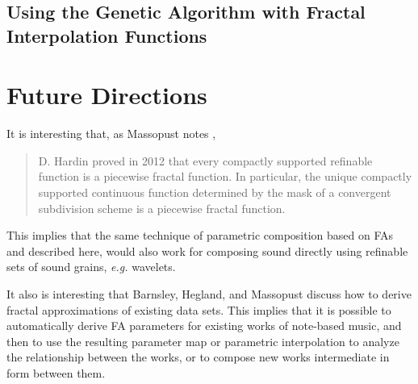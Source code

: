 \documentclass[english,11pt,letterpaper,onecolumn]{scrartcl}
\numberwithin{equation}{section}
\begin{document}
    
    \subsection{Using the Genetic Algorithm with Fractal Interpolation 
Functions}
    
    \section{Future Directions}
    
    It is interesting that, as Massopust notes \cite{massopust2017}, 
    \begin{quote}D. Hardin proved in 2012 that every compactly supported 
        refinable function is a piecewise fractal function. In particular, the 
unique 
        compactly supported continuous function determined by the mask of a 
convergent 
        subdivision scheme is a piecewise fractal function. \end{quote} 
    This implies that the same technique of parametric 
    composition based on FAs and described here, would also work for composing 
    sound directly using refinable sets of sound grains, \textit{e.g.} 
wavelets.
    
    It also is interesting that Barnsley, Hegland, and Massopust 
    \cite{2013arXiv1309.0972B} discuss how to derive fractal approximations of 
    existing data sets. This implies that it is possible to automatically 
derive 
    FA parameters for existing works of note-based music, and then to use the 
    resulting parameter map or parametric interpolation to analyze the 
    relationship between the works, or to compose new works intermediate in 
form 
    between them.
    
    \printbibliography
    
\end{document}
